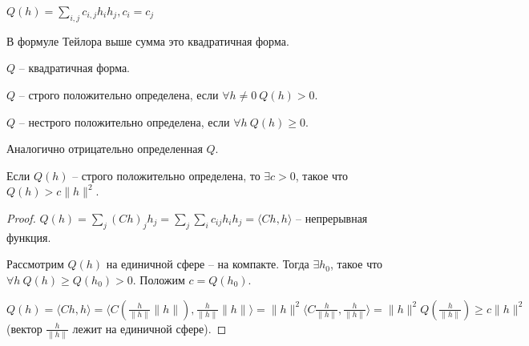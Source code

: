 
\begin{definition} \thmslashn

	$Q(h) = \sum\limits_{i, j}c_{i, j}h_ih_j, c_i = c_j$
\end{definition}

В формуле Тейлора выше сумма это квадратичная форма.

\begin{definition} \thmslashn

	$Q$ -- квадратичная форма.
	
	$Q$ -- строго положительно определена, если $\forall h \neq 0\ Q(h) > 0$.
	
	$Q$ -- нестрого положительно определена, если $\forall h\ Q(h) \ge 0$.
	
	Аналогично отрицательно определенная $Q$.
\end{definition}

\begin{lemma} \thmslashn

	Если $Q(h)$ -- строго положительно определена, то $\exists c > 0$, такое что $Q(h) > c\|h\|^2$.
	\begin{proof} \thmslashn
		
		$Q(h) = \sum\limits_{j}(Ch)_jh_j = \sum\limits_{j}\sum\limits_{i}c_{ij}h_ih_j = \langle Ch, h \rangle$ -- непрерывная функция.
		
		Рассмотрим $Q(h)$ на единичной сфере -- на компакте. Тогда $\exists h_0$, такое что $\forall h\ Q(h) \ge Q(h_0) > 0$. Положим $c = Q(h_0)$.
		
		$Q(h) = \langle Ch, h \rangle = \langle C\left(\frac{h}{\|h\|}\|h\|\right), \frac{h}{\|h\|}\|h\| \rangle = \|h\|^2 \langle C\frac{h}{\|h\|}, \frac{h}{\|h\|} \rangle = \|h\|^2Q\left(\frac{h}{\|h\|}\right) \ge c\|h\|^2$ (вектор $\frac{h}{\|h\|}$ лежит на единичной сфере).
	\end{proof}
\end{lemma}

